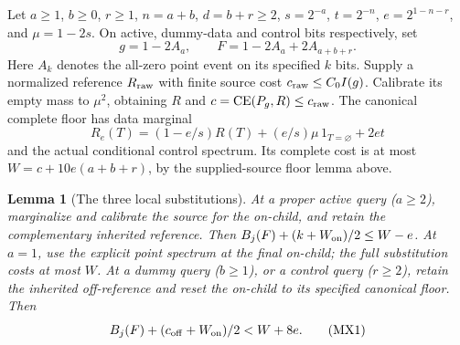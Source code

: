 \documentclass[11pt]{article}
\newtheorem{lemma}{Lemma}
\newcommand{\CE}{\operatorname{CE}}
\begin{document}
Let $a\ge1$, $b\ge0$, $r\ge1$, $n=a+b$, $d=b+r\ge2$,
$s=2^{-a}$, $t=2^{-n}$, $e=2^{1-n-r}$, and $\mu=1-2s$.
On active, dummy-data and control bits respectively, set
\[
 g=1-2A_a,\qquad F=1-2A_a+2A_{a+b+r}.
\]
Here $A_k$ denotes the all-zero point event on its specified $k$ bits.
Supply a normalized reference $R_{\rm raw}$ with finite source cost
$c_{\rm raw}\le C_0 I(g)$. Calibrate its empty mass to $\mu^2$,
obtaining $R$ and $c=\CE(P_g,R)\le c_{\rm raw}$.
The canonical complete floor has data marginal
\[
 R_e(T)=(1-e/s)R(T)+(e/s)\mu\,1_{T=\varnothing}+2et
\]
and the actual conditional control spectrum. Its complete cost is
at most $W=c+10e(a+b+r)$, by the supplied-source floor lemma above.

\begin{lemma}[The three local substitutions]
At a proper active query ($a\ge2$), marginalize and calibrate the
source for the on-child, and retain the complementary inherited
reference. Then $B_j(F)+(k+W_{\rm on})/2\le W-e$.
At $a=1$, use the explicit point spectrum at the final on-child;
the full substitution costs at most $W$.
At a dummy query ($b\ge1$), or a control query ($r\ge2$), retain
the inherited off-reference and reset the on-child to its specified
canonical floor. Then
\[
 B_j(F)+(c_{\rm off}+W_{\rm on})/2<W+8e.
 \tag{MX1}
\]
\end{lemma}
\end{document}

